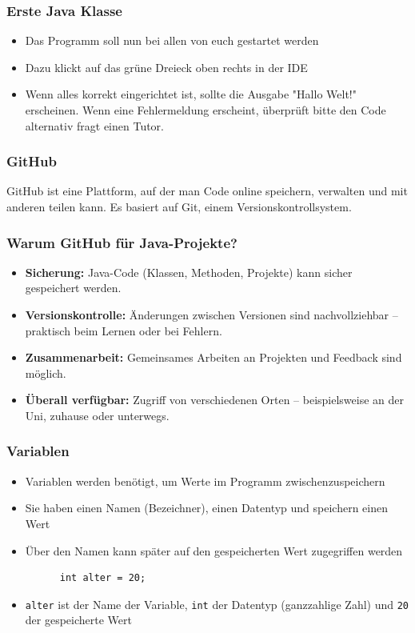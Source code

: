 \documentclass{../../presentation}
\begin{document}
\begin{frame}
  \frametitle{Erste Java Klasse}
  \begin{itemize}
    \item Das Programm soll nun bei allen von euch gestartet werden
    \item Dazu klickt auf das grüne Dreieck oben rechts in der IDE
    \item Wenn alles korrekt eingerichtet ist, sollte die Ausgabe "Hallo Welt!" erscheinen.
          \achtung{} Wenn eine Fehlermeldung erscheint, überprüft bitte den Code alternativ fragt einen Tutor.
  \end{itemize}
\end{frame}

\begin{frame}
  \frametitle{GitHub}
  GitHub ist eine Plattform, auf der man Code online speichern, verwalten und mit anderen teilen kann. Es basiert auf Git, einem Versionskontrollsystem.
\end{frame}

\begin{frame}
  \frametitle{Warum GitHub für Java-Projekte?}
  \pause
  \begin{itemize}
    \item \textbf{Sicherung:} Java-Code (Klassen, Methoden, Projekte) kann sicher gespeichert werden.
          \pause
    \item \textbf{Versionskontrolle:} Änderungen zwischen Versionen sind nachvollziehbar – praktisch beim Lernen oder bei Fehlern.
          \pause
    \item \textbf{Zusammenarbeit:} Gemeinsames Arbeiten an Projekten und Feedback sind möglich.
          \pause
    \item \textbf{Überall verfügbar:} Zugriff von verschiedenen Orten – beispielsweise an der Uni, zuhause oder unterwegs.
  \end{itemize}
\end{frame}

\begin{frame}[fragile]
  \frametitle{Variablen}
  \pause
  \begin{itemize}
    \item Variablen werden benötigt, um Werte im Programm zwischenzuspeichern
    \item Sie haben einen Namen (Bezeichner), einen Datentyp und speichern einen Wert
    \item Über den Namen kann später auf den gespeicherten Wert zugegriffen werden
          \pause
          \begin{verbatim}
      int alter = 20;
    \end{verbatim}
    \item \texttt{alter} ist der Name der Variable, \texttt{int} der Datentyp (ganzzahlige Zahl) und \texttt{20} der gespeicherte Wert
  \end{itemize}
\end{frame}
\end{document}
